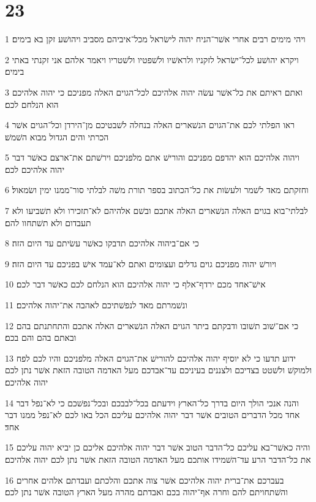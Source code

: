 \chapter{23}

\par 1 ויהי מימים רבים אחרי אשׁר־הניח יהוה לישׂראל מכל־איביהם מסביב ויהושׁע זקן בא בימים׃
\par 2 ויקרא יהושׁע לכל־ישׂראל לזקניו ולראשׁיו ולשׁפטיו ולשׁטריו ויאמר אלהם אני זקנתי באתי בימים׃
\par 3 ואתם ראיתם את כל־אשׁר עשׂה יהוה אלהיכם לכל־הגוים האלה מפניכם כי יהוה אלהיכם הוא הנלחם לכם׃
\par 4 ראו הפלתי לכם את־הגוים הנשׁארים האלה בנחלה לשׁבטיכם מן־הירדן וכל־הגוים אשׁר הכרתי והים הגדול מבוא השׁמשׁ׃
\par 5 ויהוה אלהיכם הוא יהדפם מפניכם והורישׁ אתם מלפניכם וירשׁתם את־ארצם כאשׁר דבר יהוה אלהיכם לכם׃
\par 6 וחזקתם מאד לשׁמר ולעשׂות את כל־הכתוב בספר תורת משׁה לבלתי סור־ממנו ימין ושׂמאול׃
\par 7 לבלתי־בוא בגוים האלה הנשׁארים האלה אתכם ובשׁם אלהיהם לא־תזכירו ולא תשׁביעו ולא תעבדום ולא תשׁתחוו להם׃
\par 8 כי אם־ביהוה אלהיכם תדבקו כאשׁר עשׂיתם עד היום הזה׃
\par 9 ויורשׁ יהוה מפניכם גוים גדלים ועצומים ואתם לא־עמד אישׁ בפניכם עד היום הזה׃
\par 10 אישׁ־אחד מכם ירדף־אלף כי יהוה אלהיכם הוא הנלחם לכם כאשׁר דבר לכם׃
\par 11 ונשׁמרתם מאד לנפשׁתיכם לאהבה את־יהוה אלהיכם׃
\par 12 כי אם־שׁוב תשׁובו ודבקתם ביתר הגוים האלה הנשׁארים האלה אתכם והתחתנתם בהם ובאתם בהם והם בכם׃
\par 13 ידוע תדעו כי לא יוסיף יהוה אלהיכם להורישׁ את־הגוים האלה מלפניכם והיו לכם לפח ולמוקשׁ ולשׁטט בצדיכם ולצננים בעיניכם עד־אבדכם מעל האדמה הטובה הזאת אשׁר נתן לכם יהוה אלהיכם׃
\par 14 והנה אנכי הולך היום בדרך כל־הארץ וידעתם בכל־לבבכם ובכל־נפשׁכם כי לא־נפל דבר אחד מכל הדברים הטובים אשׁר דבר יהוה אלהיכם עליכם הכל באו לכם לא־נפל ממנו דבר אחד׃
\par 15 והיה כאשׁר־בא עליכם כל־הדבר הטוב אשׁר דבר יהוה אלהיכם אליכם כן יביא יהוה עליכם את כל־הדבר הרע עד־השׁמידו אותכם מעל האדמה הטובה הזאת אשׁר נתן לכם יהוה אלהיכם׃
\par 16 בעברכם את־ברית יהוה אלהיכם אשׁר צוה אתכם והלכתם ועבדתם אלהים אחרים והשׁתחויתם להם וחרה אף־יהוה בכם ואבדתם מהרה מעל הארץ הטובה אשׁר נתן לכם׃


